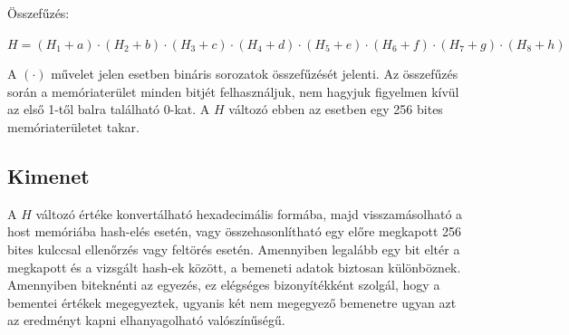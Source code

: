 Összefűzés:

{\hfil $ H = (H_1 + a) \cdot (H_2 + b) \cdot (H_3 + c) \cdot (H_4 + d) \cdot (H_5 + e) \cdot (H_6 + f) \cdot (H_7 + g) \cdot (H_8 + h)  $ \par}

\bigbreak

A $(\cdot)$ művelet jelen esetben bináris sorozatok összefűzését jelenti. Az összefűzés során a memóriaterület minden bitjét felhasználjuk, nem hagyjuk figyelmen kívül az első 1-től balra található 0-kat. A $H$ változó ebben az esetben egy 256 bites memóriaterületet takar.



\subsection{Kimenet}


A $H$ változó értéke konvertálható hexadecimális formába, majd visszamásolható a host memóriába hash-elés esetén, vagy összehasonlítható egy előre megkapott 256 bites kulccsal ellenőrzés vagy feltörés esetén. Amennyiben legalább egy bit eltér a megkapott és a vizsgált hash-ek között, a bemeneti adatok biztosan különböznek. Amennyiben biteknénti az egyezés, ez elégséges bizonyítékként szolgál, hogy a bementei értékek megegyeztek, ugyanis két nem megegyező bemenetre ugyan azt az eredményt kapni elhanyagolható valószínűségű.

